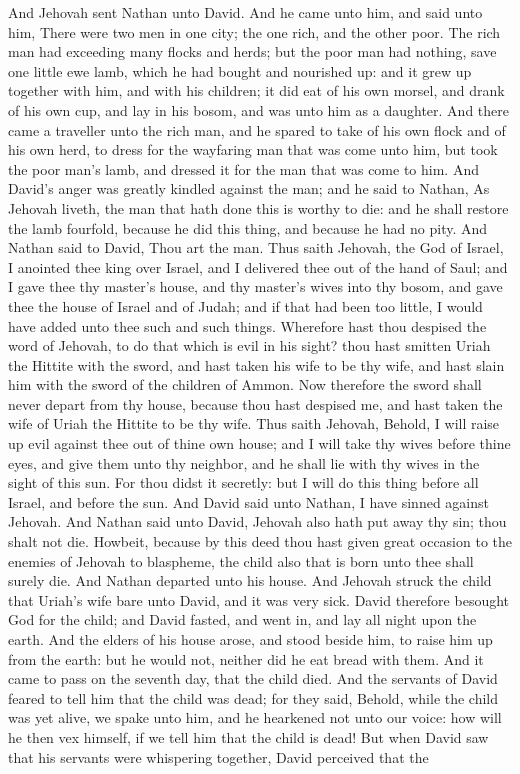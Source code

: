 And Jehovah sent Nathan unto David. And he came unto him, and said unto him, There were two men in one city; the one rich, and the other poor. The rich man had exceeding many flocks and herds; but the poor man had nothing, save one little ewe lamb, which he had bought and nourished up: and it grew up together with him, and with his children; it did eat of his own morsel, and drank of his own cup, and lay in his bosom, and was unto him as a daughter. And there came a traveller unto the rich man, and he spared to take of his own flock and of his own herd, to dress for the wayfaring man that was come unto him, but took the poor man’s lamb, and dressed it for the man that was come to him. And David’s anger was greatly kindled against the man; and he said to Nathan, As Jehovah liveth, the man that hath done this is worthy to die: and he shall restore the lamb fourfold, because he did this thing, and because he had no pity.  And Nathan said to David, Thou art the man. Thus saith Jehovah, the God of Israel, I anointed thee king over Israel, and I delivered thee out of the hand of Saul; and I gave thee thy master’s house, and thy master’s wives into thy bosom, and gave thee the house of Israel and of Judah; and if that had been too little, I would have added unto thee such and such things. Wherefore hast thou despised the word of Jehovah, to do that which is evil in his sight? thou hast smitten Uriah the Hittite with the sword, and hast taken his wife to be thy wife, and hast slain him with the sword of the children of Ammon. Now therefore the sword shall never depart from thy house, because thou hast despised me, and hast taken the wife of Uriah the Hittite to be thy wife. Thus saith Jehovah, Behold, I will raise up evil against thee out of thine own house; and I will take thy wives before thine eyes, and give them unto thy neighbor, and he shall lie with thy wives in the sight of this sun. For thou didst it secretly: but I will do this thing before all Israel, and before the sun. And David said unto Nathan, I have sinned against Jehovah. And Nathan said unto David, Jehovah also hath put away thy sin; thou shalt not die. Howbeit, because by this deed thou hast given great occasion to the enemies of Jehovah to blaspheme, the child also that is born unto thee shall surely die. And Nathan departed unto his house. And Jehovah struck the child that Uriah’s wife bare unto David, and it was very sick. David therefore besought God for the child; and David fasted, and went in, and lay all night upon the earth. And the elders of his house arose, and stood beside him, to raise him up from the earth: but he would not, neither did he eat bread with them. And it came to pass on the seventh day, that the child died. And the servants of David feared to tell him that the child was dead; for they said, Behold, while the child was yet alive, we spake unto him, and he hearkened not unto our voice: how will he then vex himself, if we tell him that the child is dead! But when David saw that his servants were whispering together, David perceived that the 
